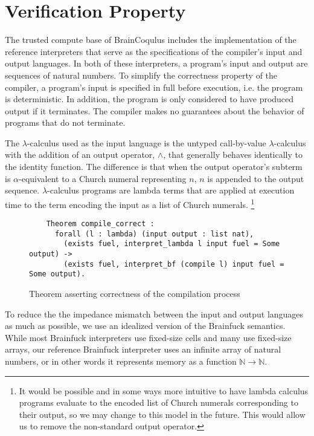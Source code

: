 \documentclass[letterpaper,twocolumn,11pt]{article}
\begin{document}
\section{Verification Property}
The trusted compute base of BrainCoqulus includes the implementation of the reference interpreters that serve as the specifications of the compiler's input and output languages. In both of these interpreters, a program's input and output are sequences of natural numbers. To simplify the correctness property of the compiler, a program's input is specified in full before execution, i.e. the program is deterministic. In addition, the program is only considered to have produced output if it terminates. The compiler makes no guarantees about the behavior of programs that do not terminate.

The $\lambda$-calculus used as the input language is the untyped call-by-value $\lambda$-calculus with the addition of an output operator, $\wedge$, that generally behaves identically to the identity function. The difference is that when the output operator's subterm is $\alpha$-equivalent to a Church numeral representing $n$, $n$ is appended to the output sequence. $\lambda$-calculus programs are lambda terms that are applied at execution time to the term encoding the input as a list of Church numerals. \footnote{It would be possible and in some ways more intuitive to have lambda calculus programs evaluate to the encoded list of Church numerals corresponding to their output, so we may change to this model in the future. This would allow us to remove the non-standard output operator.}

\begin{figure*}[!ht]
  \begin{verbatim}
    Theorem compile_correct :
      forall (l : lambda) (input output : list nat),
        (exists fuel, interpret_lambda l input fuel = Some output) ->
        (exists fuel, interpret_bf (compile l) input fuel = Some output).
  \end{verbatim}
  \caption{Theorem asserting correctness of the compilation process}
  \label{fig:CompileTheorem}
\end{figure*}

To reduce the the impedance mismatch between the input and output languages as much as possible, we use an idealized version of the Brainfuck semantics. While most Brainfuck interpreters use fixed-size cells and many use fixed-size arrays, our reference Brainfuck interpreter uses an infinite array of natural numbers, or in other words it represents memory as a function $\mathbb{N} \to \mathbb{N}$.
\end{document}
